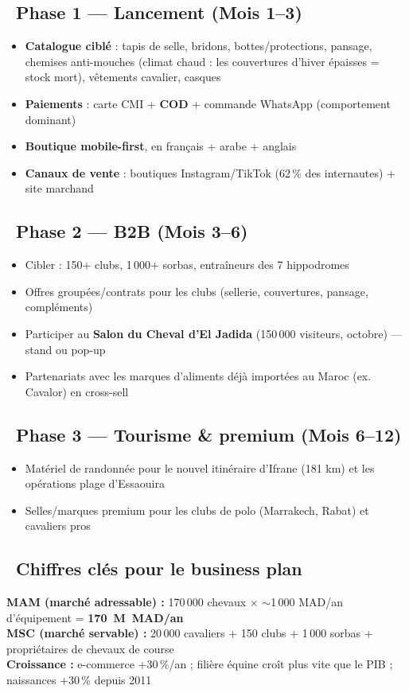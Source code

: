 \documentclass[11pt,a4paper]{article}
\begin{document}
\subsection{\faRocket\ Phase 1 --- Lancement (Mois 1--3)}
\begin{itemize}
  \item \textbf{Catalogue ciblé} : tapis de selle, bridons, bottes/protections, pansage, chemises anti-mouches (climat chaud : les couvertures d'hiver épaisses = stock mort), vêtements cavalier, casques
  \item \textbf{Paiements} : carte CMI + \textbf{COD} + commande WhatsApp (comportement dominant)
  \item \textbf{Boutique mobile-first}, en français + arabe + anglais
  \item \textbf{Canaux de vente} : boutiques Instagram/TikTok (62\,\% des internautes) + site marchand
\end{itemize}

\subsection{\faHandshake\ Phase 2 --- B2B (Mois 3--6)}
\begin{itemize}
  \item Cibler : 150+ clubs, 1\,000+ sorbas, entraîneurs des 7 hippodromes
  \item Offres groupées/contrats pour les clubs (sellerie, couvertures, pansage, compléments)
  \item Participer au \textbf{Salon du Cheval d'El Jadida} (150\,000 visiteurs, octobre) --- stand ou pop-up
  \item Partenariats avec les marques d'aliments déjà importées au Maroc (ex. Cavalor) en cross-sell
\end{itemize}

\subsection{\faGem\ Phase 3 --- Tourisme \& premium (Mois 6--12)}
\begin{itemize}
  \item Matériel de randonnée pour le nouvel itinéraire d'Ifrane (181 km) et les opérations plage d'Essaouira
  \item Selles/marques premium pour les clubs de polo (Marrakech, Rabat) et cavaliers pros
\end{itemize}

\subsection{\faChartLine\ Chiffres clés pour le business plan}
\begin{keybox}
\RaggedRight
\textbf{MAM (marché adressable) :} 170\,000 chevaux $\times$ $\sim$1\,000 MAD/an d'équipement = \textbf{170~M~MAD/an}\\[1mm]
\textbf{MSC (marché servable) :} 20\,000 cavaliers + 150 clubs + 1\,000 sorbas + propriétaires de chevaux de course\\[1mm]
\textbf{Croissance :} e-commerce +30\,\%/an ; filière équine croît plus vite que le PIB ; naissances +30\,\% depuis 2011
\end{keybox}
\end{document}
